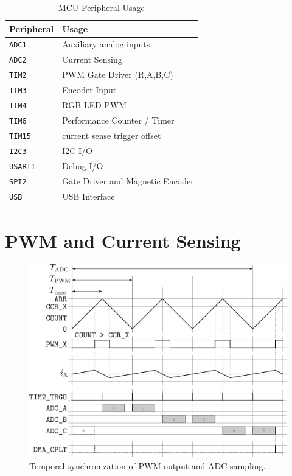 \documentclass[12pt,a4paper,oneside,openany]{article}
\begin{document}
\begin{table}[htbp]
\caption{MCU Peripheral Usage}
\begin{center}
\begin{tabular}{|l|l|}
\hline Peripheral & Usage \\
\hline \texttt{ADC1} & Auxiliary analog inputs \\
\texttt{ADC2} & Current Sensing \\
\hline
\texttt{TIM2} & PWM Gate Driver (R,A,B,C) \\
\texttt{TIM3} & Encoder Input \\
\texttt{TIM4} & RGB LED PWM \\
\texttt{TIM6} & Performance Counter / Timer \\
\texttt{TIM15} & current sense trigger offset \\
\hline
\texttt{I2C3} & I2C I/O \\
\texttt{USART1} & Debug I/O \\ 
\texttt{SPI2} & Gate Driver and Magnetic Encoder \\
\texttt{USB} & USB Interface \\
\hline
\end{tabular}
\end{center}
\label{tab:mcu-peripherals}
\end{table}%


\section{PWM and Current Sensing}

\begin{figure}[htbp]
\begin{center}
\includegraphics[scale=0.4]{n17-servo-pwm-adc.pdf}
\caption[PWM and ADC Sync]{Temporal synchronization of PWM output and ADC sampling.}
\label{fig:pwm-adc}
\end{center}
\end{figure}
\end{document}
